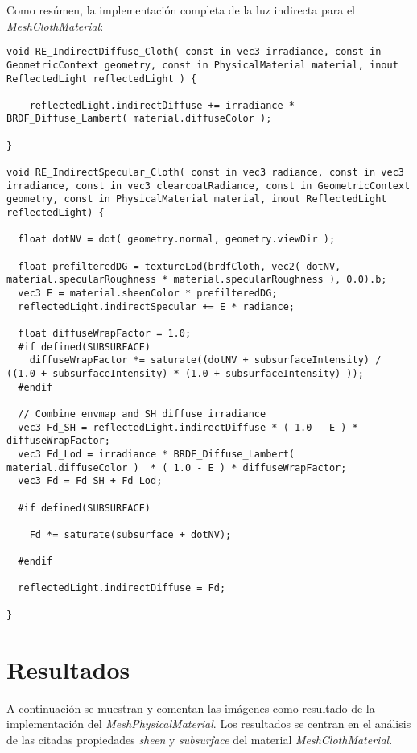 Como res\'umen, la implementaci\'on completa de la luz indirecta para el \textit{MeshClothMaterial}:\\

    \begin{lstlisting}
void RE_IndirectDiffuse_Cloth( const in vec3 irradiance, const in GeometricContext geometry, const in PhysicalMaterial material, inout ReflectedLight reflectedLight ) {

    reflectedLight.indirectDiffuse += irradiance * BRDF_Diffuse_Lambert( material.diffuseColor );

}

void RE_IndirectSpecular_Cloth( const in vec3 radiance, const in vec3 irradiance, const in vec3 clearcoatRadiance, const in GeometricContext geometry, const in PhysicalMaterial material, inout ReflectedLight reflectedLight) {

  float dotNV = dot( geometry.normal, geometry.viewDir );

  float prefilteredDG = textureLod(brdfCloth, vec2( dotNV, material.specularRoughness * material.specularRoughness ), 0.0).b;
  vec3 E = material.sheenColor * prefilteredDG;
  reflectedLight.indirectSpecular += E * radiance;

  float diffuseWrapFactor = 1.0;
  #if defined(SUBSURFACE)
    diffuseWrapFactor *= saturate((dotNV + subsurfaceIntensity) / ((1.0 + subsurfaceIntensity) * (1.0 + subsurfaceIntensity) ));
  #endif

  // Combine envmap and SH diffuse irradiance
  vec3 Fd_SH = reflectedLight.indirectDiffuse * ( 1.0 - E ) * diffuseWrapFactor;
  vec3 Fd_Lod = irradiance * BRDF_Diffuse_Lambert( material.diffuseColor )  * ( 1.0 - E ) * diffuseWrapFactor;
  vec3 Fd = Fd_SH + Fd_Lod;

  #if defined(SUBSURFACE)

    Fd *= saturate(subsurface + dotNV);

  #endif

  reflectedLight.indirectDiffuse = Fd;

}
    \end{lstlisting}
    \singlespacing

\section{Resultados}

A continuaci\'on se muestran y comentan las im\'agenes como resultado de la implementaci\'on del \textit{MeshPhysicalMaterial}. Los resultados se centran
en el an\'alisis de las citadas propiedades \textit{sheen} y \textit{subsurface} del material \textit{MeshClothMaterial}.

